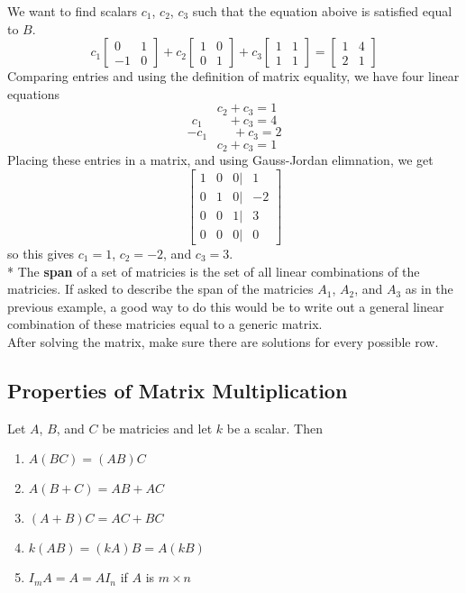 We want to find scalars $c_1$, $c_2$, $c_3$ such that the equation aboive is satisfied equal to $B$.
$$c_1\begin{bmatrix}
    0&1\\-1&0
\end{bmatrix} + c_2\begin{bmatrix}
    1&0\\0&1
\end{bmatrix} + c_3\begin{bmatrix}
    1&1\\1&1
\end{bmatrix} = \begin{bmatrix}
    1&4\\2&1
\end{bmatrix}$$
Comparing entries and using the definition of matrix equality, we have four linear equations
$$\qquad c_2 + c_3 = 1$$
$$c_1\qquad + c_3 = 4$$
$$-c_1\qquad + c_3 = 2$$
$$\qquad c_2 + c_3 = 1$$
Placing these entries in a matrix, and using Gauss-Jordan elimnation, we get
$$\begin{bmatrix}
    1&0&0|&1\\0&1&0|&-2\\0&0&1|&3\\0&0&0|&0
\end{bmatrix}$$
so this gives $c_1 = 1$, $c_2 = -2$, and $c_3 = 3$.\\*
The \textbf{span} of a set of matricies is the set of all linear combinations of the matricies.
If asked to describe the span of the matricies $A_1$, $A_2$, and $A_3$ as in the previous example, a good way to do this would be to write out a general linear combination of these matricies equal to a generic matrix.\\
After solving the matrix, make sure there are solutions for every possible row. 
\subsection*{Properties of Matrix Multiplication}
Let $A$, $B$, and $C$ be matricies and let $k$ be a scalar. Then
\begin{enumerate}
    \item $A(BC) = (AB)C$
    \item $A(B+C) = AB + AC$
    \item $(A+B)C = AC + BC$
    \item $k(AB) = (kA)B = A(kB)$
    \item $I_mA = A = AI_n$ if $A$ is $m\times n$
\end{enumerate}
